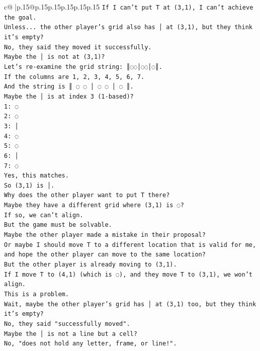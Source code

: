 \documentclass{article}
\begin{document}
{\begin{supertabular}{c@{$\;$}|p{.15\linewidth}@{}p{.15\linewidth}p{.15\linewidth}p{.15\linewidth}p{.15\linewidth}p{.15\linewidth}}
{{{\texttt{If I can't put T at (3,1), I can't achieve the goal.} \\
\texttt{Unless... the other player's grid also has │ at (3,1), but they think it's empty?} \\
\texttt{No, they said they moved it successfully.} \\
\texttt{Maybe the │ is not at (3,1)?} \\
\texttt{Let's re{-}examine the grid string: ║◌◌│◌◌│◌║.} \\
\texttt{If the columns are 1, 2, 3, 4, 5, 6, 7.} \\
\texttt{And the string is ║ ◌ ◌ │ ◌ ◌ │ ◌ ║.} \\
\texttt{Maybe the │ is at index 3 (1{-}based)?} \\
\texttt{1: ◌} \\
\texttt{2: ◌} \\
\texttt{3: │} \\
\texttt{4: ◌} \\
\texttt{5: ◌} \\
\texttt{6: │} \\
\texttt{7: ◌} \\
\texttt{Yes, this matches.} \\
\texttt{So (3,1) is │.} \\
\texttt{Why does the other player want to put T there?} \\
\texttt{Maybe they have a different grid where (3,1) is ◌?} \\
\texttt{If so, we can't align.} \\
\texttt{But the game must be solvable.} \\
\texttt{Maybe the other player made a mistake in their proposal?} \\
\texttt{Or maybe I should move T to a different location that is valid for me, and hope the other player can move to the same location?} \\
\texttt{But the other player is already moving to (3,1).} \\
\texttt{If I move T to (4,1) (which is ◌), and they move T to (3,1), we won't align.} \\
\texttt{This is a problem.} \\
\texttt{Wait, maybe the other player's grid has │ at (3,1) too, but they think it's empty?} \\
\texttt{No, they said "successfully moved".} \\
\texttt{Maybe the │ is not a line but a cell?} \\
\texttt{No, "does not hold any letter, frame, or line!".} \\
}}}
\end{supertabular}}
\end{document}
